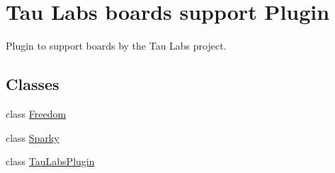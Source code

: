 \hypertarget{group___boards___tau_labs_plugin}{\section{Tau Labs boards support Plugin}
\label{group___boards___tau_labs_plugin}
}


Plugin to support boards by the Tau Labs project.  


\subsection*{Classes}
\begin{DoxyCompactItemize}
\item 
class \hyperlink{class_freedom}{Freedom}
\item 
class \hyperlink{class_sparky}{Sparky}
\item 
class \hyperlink{class_tau_labs_plugin}{Tau\-Labs\-Plugin}
\end{DoxyCompactItemize}
